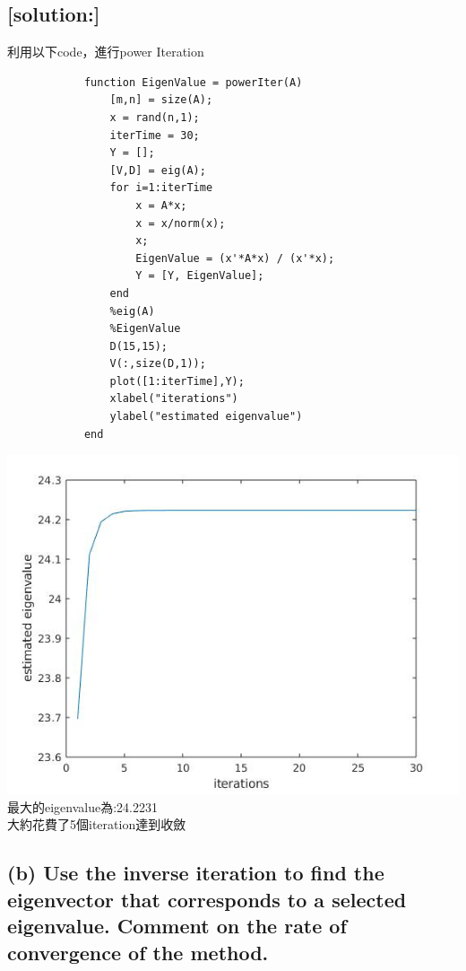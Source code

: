 \documentclass[12pt]{article}
\begin{document}
        \subsection*{[solution:]}
        利用以下code，進行power Iteration
        \begin{lstlisting}
            function EigenValue = powerIter(A)
                [m,n] = size(A);
                x = rand(n,1);
                iterTime = 30;
                Y = [];
                [V,D] = eig(A);
                for i=1:iterTime
                    x = A*x;
                    x = x/norm(x);
                    x;
                    EigenValue = (x'*A*x) / (x'*x);
                    Y = [Y, EigenValue];
                end
                %eig(A)
                %EigenValue
                D(15,15);
                V(:,size(D,1));
                plot([1:iterTime],Y);
                xlabel("iterations")
                ylabel("estimated eigenvalue")
            end
        \end{lstlisting}
        \includegraphics[scale=0.75]{powerIter.jpg}\\
        最大的eigenvalue為:24.2231\\
        大約花費了5個iteration達到收斂
        \subsection*{(b) Use the inverse iteration to find the eigenvector that corresponds to a selected
        eigenvalue. Comment on the rate of convergence of the method.}
\end{document}
